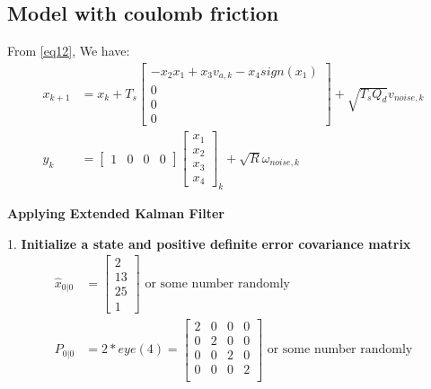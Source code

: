 \documentclass[12pt,a4paper]{article}
\begin{document}
	\subsection{Model with coulomb friction}
	From \autoref{eq12}, We have:
	\[
	\begin{split}
		x_{k+1} &= x_k + T_s
		\begin{bmatrix}
			-x_2 x_1 + x_3 v_{a,k} - x_4sign(x_1) \\
			0                                     \\
			0                                     \\
			0                                     
		\end{bmatrix} +\sqrt{T_s Q_d}v_{noise,k}\\
		y_k &= 
		\begin{bmatrix}
			1 & 0 & 0 & 0 
		\end{bmatrix}
		\begin{bmatrix}
			x_1 \\
			x_2 \\
			x_3 \\
			x_4 
		\end{bmatrix}_k+\sqrt{R}\omega_{noise,k}
	\end{split}
	\]
	\begin{center}
		\textbf{Applying Extended Kalman Filter}
	\end{center}
	1. \textbf{Initialize a state and positive definite error covariance matrix}
	\[\begin{split}
		\hat{x}_{0|0} &= \begin{bmatrix}
			2 \\
			13 \\
			25 \\
			1
		\end{bmatrix} \text{ or some number randomly}\\
		P_{0|0} &= 2*eye(4) = 
		\begin{bmatrix}
			2 & 0 & 0 & 0 \\
			0 & 2 & 0 & 0 \\
			0 & 0 & 2 & 0 \\
			0 & 0 & 0 & 2 \\
		\end{bmatrix} \text{ or some number randomly}
	\end{split}\]
	
\end{document}
